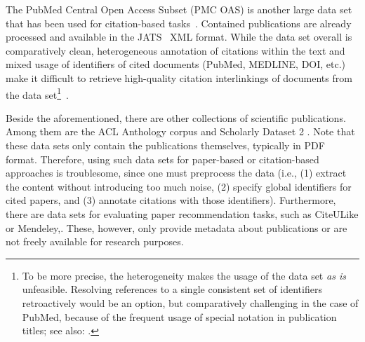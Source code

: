 The PubMed Central Open Access Subset (PMC OAS) is another large data set that has been used for citation-based tasks~\cite{Gipp2015,Duma2016,Galke2018}. Contained publications are already processed and available in the JATS~\cite{Huh2014} XML format. While the data set overall is comparatively clean, heterogeneous annotation of citations within the text and mixed usage of identifiers of cited documents (PubMed, MEDLINE, DOI, etc.) make it difficult to retrieve high-quality citation interlinkings of documents from the data set\footnote{To be more precise, the heterogeneity makes the usage of the data set \emph{as is} unfeasible. Resolving references to a single consistent set of identifiers retroactively would be an option, but comparatively challenging in the case of PubMed, because of the frequent usage of special notation in publication titles; see also: .}~\cite{Gipp2015}.

Beside the aforementioned, there are other collections of scientific publications. Among them are the ACL Anthology corpus \cite{Bird2008ACLARC} and Scholarly Dataset 2 \cite{Sugiyama2015}.
Note that these data sets only contain the publications themselves, typically in PDF format. Therefore, using such data sets for paper-based or citation-based approaches is troublesome, since one must preprocess the data (i.e., (1) extract the content without introducing too much noise, (2) specify global identifiers for cited papers, and (3) annotate citations with those identifiers).
Furthermore, there are data sets for evaluating paper recommendation tasks, such as CiteULike or Mendeley,. These, however, only provide metadata about publications or are not freely available for research purposes.

